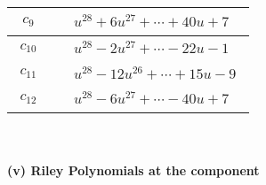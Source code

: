 \documentclass[1p]{elsarticle_modified}
\theoremstyle{definition}
\begin{document}
\begin{tabular}{m{50pt}|m{274pt}}
\hline $$\begin{aligned}c_{9}\end{aligned}$$&$\begin{aligned}
&u^{28}+6 u^{27}+\cdots+40 u+7
\end{aligned}$\\
\hline $$\begin{aligned}c_{10}\end{aligned}$$&$\begin{aligned}
&u^{28}-2 u^{27}+\cdots-22 u-1
\end{aligned}$\\
\hline $$\begin{aligned}c_{11}\end{aligned}$$&$\begin{aligned}
&u^{28}-12 u^{26}+\cdots+15 u-9
\end{aligned}$\\
\hline $$\begin{aligned}c_{12}\end{aligned}$$&$\begin{aligned}
&u^{28}-6 u^{27}+\cdots-40 u+7
\end{aligned}$\\
\hline
\end{tabular}\\~\\
\newpage\renewcommand{\arraystretch}{1}
\flushleft \textbf{(v) Riley Polynomials at the component}\newline \\
\end{document}
